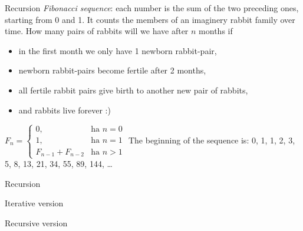 \documentclass[usenames,dvipsnames,aspectratio=169]{beamer}
\begin{document}
\begin{frame}{Recursion}
  \emph{Fibonacci sequence}: each number is the sum of the two preceding ones, starting from 0 and 1. It counts the members of an imaginery rabbit family over time. How many pairs of rabbits will we have after $n$ months if
  \begin{itemize}
    \item in the first month we only have 1 newborn rabbit-pair,
    \item newborn rabbit-pairs become fertile after 2 months,
    \item all fertile rabbit pairs give birth to another new pair of rabbits,
    \item and rabbits live forever :)
  \end{itemize}
  \vfill
  $F_n = \left\{ \begin{array}{ll}
    0, & \textrm{ha $n=0$}\\
    1, & \textrm{ha $n=1$}\\
    F_{n-1} + F_{n-2} & \textrm{ha $n>1$}
  \end{array} \right.$
  \vfill
  The beginning of the sequence is: 0, 1, 1, 2, 3, 5, 8, 13, 21, 34, 55, 89, 144, \dots
\end{frame}

\begin{frame}{Recursion}
  \scriptsize
  \begin{exampleblock}{ Iterative version}
    \scriptsize
    \vspace{-.3cm}
    
    \vspace{-.3cm}
  \end{exampleblock}
  \begin{exampleblock}{ Recursive version}
    \scriptsize
    \vspace{-.3cm}
    
    \vspace{-.3cm}
  \end{exampleblock}
\end{frame}
\end{document}
